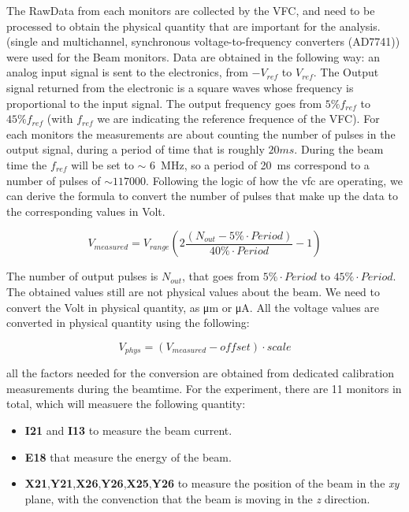 \documentclass[10pt,a4paper]{article}
\begin{document}
The RawData from each monitors are collected by the VFC, and need to be processed to obtain the physical quantity that are important for the analysis. (single and multichannel, synchronous voltage-to-frequency converters (AD7741)) were used for the Beam monitors. Data are obtained in the following way:  an analog input signal is sent to the electronics, from $-V_{ref}$ to $V_{ref}$. The Output signal returned from the electronic is a square waves whose frequency is proportional to the input signal. The output frequency goes from $5\% f_{ref}$ to $45\% f_{ref}$ (with $f_{ref}$ we are indicating the reference frequence of the VFC). For each monitors the measurements are about counting the number of pulses in the output signal, during a period of time that is roughly $20ms$. During the beam time the $f_{ref}$ will be set to $\sim$ \SI{6}{\mega\hertz}, so a period of \SI{20}{ms} correspond to a number of pulses of $\sim 117000$. Following the logic of how the vfc are operating, we can derive the formula to convert the number of pulses that make up the data to the corresponding values in Volt. 

\begin{equation}
V_{measured} = V_{range} ( 2 \dfrac{( N_{out} - 5\% \cdot Period )}{ 40\% \cdot Period} -1)
\end{equation}

The number of output pulses is $N_{out}$, that goes from $5\% \cdot Period$ to $45\% \cdot Period$. 
The obtained values still are not physical values about the beam. We need to convert the Volt in physical quantity, as \si{\micro \meter} or \si{\micro \ampere}. All the voltage values are converted in physical quantity using the following:

\begin{equation}
 V_{phys} = (V_{measured} - offset) \cdot scale 
\end{equation}

all the factors needed for the conversion are obtained from dedicated calibration measurements during the beamtime. For the experiment, there are 11 monitors in total, which will measuere the following quantity:

\begin{itemize}

\item \textbf{I21} and \textbf{I13} to measure the beam current.
\item \textbf{E18} that measure the energy of the beam.
\item \textbf{X21},\textbf{Y21},\textbf{X26},\textbf{Y26},\textbf{X25},\textbf{Y26} to measure the position of the beam in the \textit{xy} plane, with the convenction that the beam is moving in the \textit{z} direction.

\end{itemize}
\end{document}
